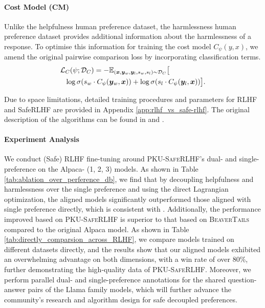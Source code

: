 \documentclass[11pt]{article}
\theoremstyle{plain}
\theoremstyle{definition}
\theoremstyle{remark}
\newcommand{\db}{\textsc{PKU-SafeRLHF}}
\begin{document}
\paragraph{Cost Model (CM)}
Unlike the helpfulness human preference dataset, the harmlessness human preference dataset provides additional information about the harmlessness of a response. To optimise this information for training the cost model $C_{\psi}(y, x)$, we amend the original pairwise comparison loss by incorporating classification terms.
\begin{align*}
    &\mathcal{L}_C(\psi;\mathcal{D}_C) = - \mathbb{E}_{({\bm{x}}, {\bm{y}}_w, {\bm{y}}_l, s_w, s_l)\sim \mathcal{D}_C} \big[ \\ 
    &~~\log\sigma(s_w \cdot C_\psi({\bm{y}}_w,{\bm{x}})) + \log\sigma(s_l \cdot C_\psi({\bm{y}}_l,{\bm{x}}))\big].
\end{align*}

Due to space limitations, detailed training procedures and parameters for RLHF and SafeRLHF are provided in Appendix \ref{app:rlhf_vs_safe-rlhf}. The original description of the algorithms can be found in \citep{ouyang2022training} and \citep{dai2024safe}.

\paragraph{Experiment Analysis}
We conduct (Safe) RLHF fine-tuning around \db{}'s dual- and single-preference on the Alpaca- (1, 2, 3) models. As shown in Table \ref{tab:ablation_over_perference_db}, we find that by decoupling helpfulness and harmlessness over the single preference and using the direct Lagrangian optimization, the aligned models significantly outperformed those aligned with single preference directly, which is consistent with \citep{dai2024safe}. Additionally, the performance improved based on \db{} is superior to that based on \textsc{BeaverTails} compared to the original Alpaca model. As shown in Table \ref{tab:directly_comparsion_across_RLHF}, we compare models trained on different datasets directly, and the results show that our aligned models exhibited an overwhelming advantage on both dimensions, with a win rate of over 80\%, further demonstrating the high-quality data of \db{}. Moreover, we perform parallel dual- and single-preference annotations for the shared question-answer pairs of the Llama family models, which will further advance the community's research and algorithm design for safe decoupled preferences.
\end{document}
